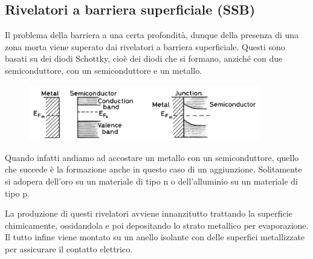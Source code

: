 \subsection{Rivelatori a barriera superficiale (SSB)}
Il problema della barriera a una certa profondità, dunque della presenza di una zona morta viene superato dai rivelatori a barriera superficiale. Questi sono basati su dei diodi Schottky, cioè dei diodi che si formano, anziché con due semiconduttore, con un semiconduttore e un metallo.
\begin{figure}[H]
   \centering
   \includegraphics[width=0.9\textwidth]{immagini/rivelatori_a_barriera_superficiale.png}
\end{figure}
Quando infatti andiamo ad accostare un metallo con un semiconduttore, quello che succede è la formazione anche in questo caso di un aggiunzione. Solitamente si adopera dell'oro su un materiale di tipo n o dell'alluminio su un materiale di tipo p.

La produzione di questi rivelatori avviene innanzitutto trattando la superficie chimicamente, ossidandola e poi depositando lo strato metallico per evaporazione. Il tutto infine viene montato su un anello isolante con delle superfici metallizzate per assicurare il contatto elettrico.

